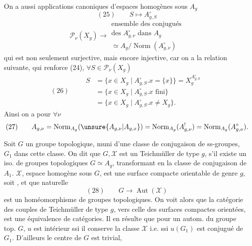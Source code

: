 On a aussi  applications canoniques
d'espaces homogènes sous $A_g$
\[
(25)\qquad S\longmapsto A_{g,S}^{\circ}
\]
\[
\mathcal P_\nu(X_g)\longrightarrow
\begin{gathered}
\text{ensemble des conjugués}\\
\text{des }A_{g,\nu}^{\circ}\text{ dans }A_g\\
\simeq A_g/\operatorname{Norm}(A_{g,\nu}^{\circ})
\end{gathered}
\]
qui est non seulement surjective, mais encore
injective, car on a la relation suivante, qui
renforce  (24), $\forall S\in\mathcal P_\nu(X_g)$
\[
(26)\qquad\begin{aligned}
S&=\{x\in X_g\mid A_{g,S}^{\circ}.x=\{x\}\}=X_g^{A_{g,S}^{\circ}}\\
 &=\{x\in X_g\mid A_{g,S}^{\circ}.x\text{ fini}\}\\
 &=\{x\in X_g\mid A_{g,S}^{\circ}.x\ne X_g\}.
\end{aligned}
\]
 Ainsi on a pour $\forall\nu$
\[
(27)\qquad A_{g,\nu}=\operatorname{Norm}_{A_g}(\unsure{A_{g,\nu}|A_{g,x}})
=\operatorname{Norm}_{A_g}(A_{g,\nu}^!)=\operatorname{Norm}_{A_g}(A_{g,\nu}^{\circ}).
\]

Soit $G$ un groupe topologique, muni
d'une classe de conjugaison  de ss-groupes,
 $G_1$ dans cette classe. On dit que
$G,\mathcal X$ est un   Teichmüller
de type $g$, s'il existe un iso. de groupes
topologiques $G\simeq A_g$, transformant
 en la classe de conjugaison de $A_1$.
 $\mathcal X$, 
espace homogène
sous $G$, est  une
surface compacte orientable de genre $g$,
 soit , et que
 
naturelle
\[
(28)\qquad G\longrightarrow\operatorname{Aut}(\mathcal X)
\]
est un homéomorphisme de groupes topologiques.
On voit alors que 
la catégorie des
couples de Teichmüller de type $g$, vers
celle des surfaces compactes orientées, est
une équivalence de catégories. Il en résulte
que  pour un autom.  du
groupe top. $G$, $u$ est intérieur ssi il
conserve la classe $\mathcal X$ i.e. ssi $u(G_1)$ est conjugué
de $G_1$. D'ailleurs le centre de $G$ est trivial, 

